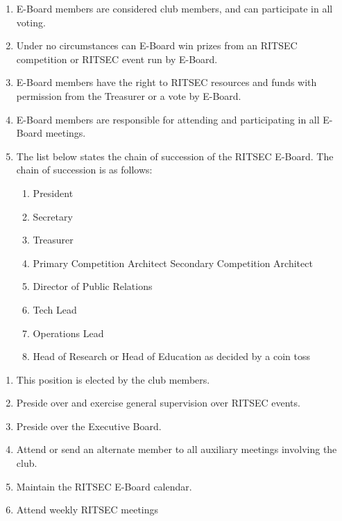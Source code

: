 


\begin{enumerate}
  \item E-Board members are considered club members, and can participate in all
    voting.
  \item Under no circumstances can E-Board win prizes from an RITSEC
    competition or RITSEC event run by E-Board.
  \item E-Board members have the right to RITSEC resources and funds with
    permission from the Treasurer or a vote by E-Board.
  \item E-Board members are responsible for attending and participating in all
    E-Board meetings.
  \item The list below states the chain of succession of the RITSEC E-Board.
    The chain of succession is as follows:
  \begin{enumerate}
    \item President
    \item Secretary
    \item Treasurer
    \item Primary Competition Architect 
    \itme Secondary Competition Architect
    \item Director of Public Relations
    \item Tech Lead
    \item Operations Lead
    \item Head of Research or Head of Education as decided by a coin toss
  \end{enumerate}
\end{enumerate}


\begin{enumerate}
  \item This position is elected by the club members.
  \item Preside over and exercise general supervision over RITSEC events. 
  \item Preside over the Executive Board.
  \item Attend or send an alternate member to all auxiliary meetings involving
    the club.
  \item Maintain the RITSEC E-Board calendar.
  \item Attend weekly RITSEC meetings
\end{enumerate}


